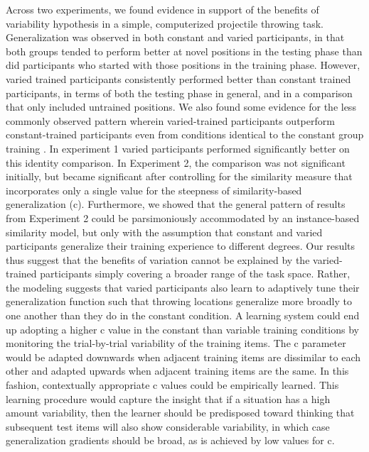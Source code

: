 \documentclass[
  12pt,
  letterpaper,
]{article}
\begin{document}
Across two experiments, we found evidence in support of the benefits of
variability hypothesis in a simple, computerized projectile throwing
task. Generalization was observed in both constant and varied
participants, in that both groups tended to perform better at novel
positions in the testing phase than did participants who started with
those positions in the training phase. However, varied trained
participants consistently performed better than constant trained
participants, in terms of both the testing phase in general, and in a
comparison that only included untrained positions. We also found some
evidence for the less commonly observed pattern wherein varied-trained
participants outperform constant-trained participants even from
conditions identical to the constant group training
\autocite{goodeSuperiorityVariableRepeated2008,greenPracticeVariabilityTransfer1995a,kerrSpecificVariedPractice1978}.
In experiment 1 varied participants performed significantly better on
this identity comparison. In Experiment 2, the comparison was not
significant initially, but became significant after controlling for the
similarity measure that incorporates only a single value for the
steepness of similarity-based generalization (c). Furthermore, we showed
that the general pattern of results from Experiment 2 could be
parsimoniously accommodated by an instance-based similarity model, but
only with the assumption that constant and varied participants
generalize their training experience to different degrees. Our results
thus suggest that the benefits of variation cannot be explained by the
varied-trained participants simply covering a broader range of the task
space. Rather, the modeling suggests that varied participants also learn
to adaptively tune their generalization function such that throwing
locations generalize more broadly to one another than they do in the
constant condition. A learning system could end up adopting a higher c
value in the constant than variable training conditions by monitoring
the trial-by-trial variability of the training items. The c parameter
would be adapted downwards when adjacent training items are dissimilar
to each other and adapted upwards when adjacent training items are the
same. In this fashion, contextually appropriate c values could be
empirically learned. This learning procedure would capture the insight
that if a situation has a high amount variability, then the learner
should be predisposed toward thinking that subsequent test items will
also show considerable variability, in which case generalization
gradients should be broad, as is achieved by low values for c.
\end{document}
